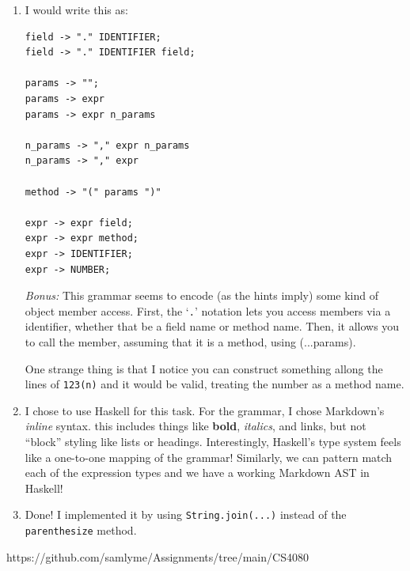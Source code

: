 \documentclass{article}
\begin{document}
\begin{enumerate}
    \item I would write this as: 

    \begin{verbatim}
field -> "." IDENTIFIER;
field -> "." IDENTIFIER field;

params -> ""; 
params -> expr
params -> expr n_params

n_params -> "," expr n_params
n_params -> "," expr 

method -> "(" params ")"

expr -> expr field;
expr -> expr method;
expr -> IDENTIFIER;
expr -> NUMBER;

    \end{verbatim}
    \emph{Bonus:} This grammar seems to encode (as the hints imply) some kind of 
    object member access. First, the `\verb|.|' notation lets you access members via a 
    identifier, whether that be a field name or method name. Then, it allows you 
    to call the member, assuming that it is a method, using (...params).

    One strange thing is that I notice you can construct something allong the lines 
    of \verb*|123(n)| and it would be valid, treating the number as a method name.

    \item {
        I chose to use Haskell for this task. For the grammar, I chose Markdown's \emph{inline} syntax.
        this includes things like \textbf{bold}, \emph{italics}, and links, but not 
        ``block'' styling like lists or headings. Interestingly, Haskell's type system 
        feels like a one-to-one mapping of the grammar! Similarly, we can pattern 
        match each of the expression types and we have a working Markdown AST in Haskell!

        
    }

    \item {
        Done! I implemented it by using \verb|String.join(...)| instead of 
        the \verb|parenthesize| method.
    }
\end{enumerate}

https://github.com/samlyme/Assignments/tree/main/CS4080
\end{document}
